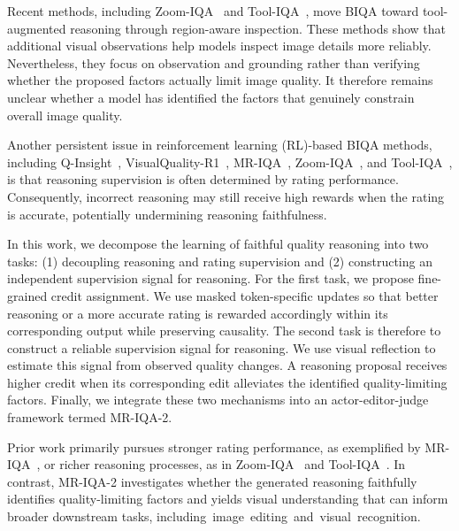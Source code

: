 \documentclass[letterpaper]{article} %
\begin{document}
Recent methods, including Zoom-IQA~\citep{zoom-iqa} and
Tool-IQA~\citep{tool-iqa}, move BIQA toward tool-augmented reasoning through
region-aware inspection. These methods show that
additional visual observations help models inspect image details more reliably.
Nevertheless, they focus on observation and grounding rather than verifying
whether the proposed factors actually limit image quality. It therefore remains
unclear whether a model has identified the factors that genuinely constrain
overall image quality.

Another persistent issue in reinforcement learning (RL)-based BIQA methods,
including Q-Insight~\citep{q-insight},
VisualQuality-R1~\citep{Visualquality-r1},
MR-IQA~\citep{mr-iqa},
Zoom-IQA~\citep{zoom-iqa}, and
Tool-IQA~\citep{tool-iqa}, is that reasoning supervision is often determined
by rating performance. Consequently, incorrect reasoning may still receive
high rewards when the rating is accurate, potentially undermining reasoning
faithfulness.

In this work, we decompose the learning of faithful quality reasoning into two
tasks: (1) decoupling reasoning and rating supervision and (2) constructing an
independent supervision signal for reasoning. For the first task, we propose
fine-grained credit assignment. We use masked token-specific updates so that
better reasoning or a more accurate rating is rewarded accordingly within its
corresponding output while preserving causality. The second task is therefore to construct a
reliable supervision signal for reasoning. We use visual reflection to estimate
this signal from observed quality changes. A reasoning proposal receives higher
credit when its corresponding edit alleviates the identified quality-limiting
factors. Finally, we integrate these two mechanisms into an actor-editor-judge
framework termed MR-IQA-2.

Prior work primarily pursues stronger rating performance, as exemplified by MR-IQA~\citep{mr-iqa}, or richer reasoning processes, as in Zoom-IQA~\citep{zoom-iqa} and Tool-IQA~\citep{tool-iqa}. In contrast, MR-IQA-2 investigates whether the generated reasoning faithfully identifies quality-limiting factors and yields visual understanding that can inform broader downstream tasks, \mbox{including image editing and visual recognition}.
\end{document}
